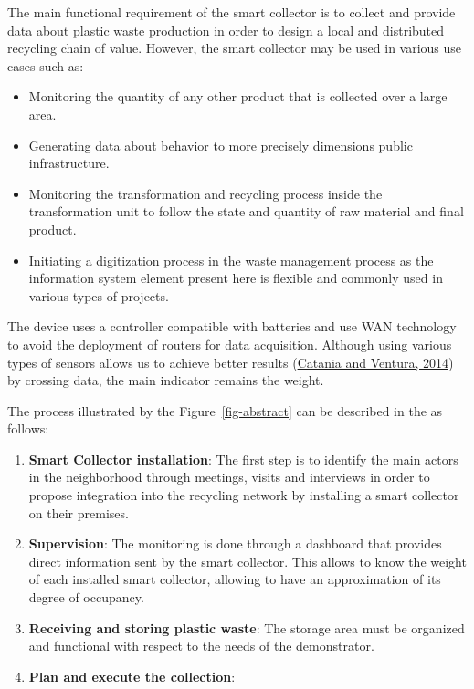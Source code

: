 \documentclass[
  11pt,
]{article}
\providecommand{\tightlist}{%
  \setlength{\itemsep}{0pt}\setlength{\parskip}{0pt}}\usepackage{longtable,booktabs,array}
\begin{document}
The main functional requirement of the smart collector is to collect and
provide data about plastic waste production in order to design a local
and distributed recycling chain of value. However, the smart collector
may be used in various use cases such as:

\begin{itemize}
\tightlist
\item
  Monitoring the quantity of any other product that is collected over a
  large area.\\
\item
  Generating data about behavior to more precisely dimensions public
  infrastructure.\\
\item
  Monitoring the transformation and recycling process inside the
  transformation unit to follow the state and quantity of raw material
  and final product.\\
\item
  Initiating a digitization process in the waste management process as
  the information system element present here is flexible and commonly
  used in various types of projects.
\end{itemize}

The device uses a controller compatible with batteries and use WAN
technology to avoid the deployment of routers for data acquisition.
Although using various types of sensors allows us to achieve better
results (\protect\hyperlink{ref-Catania2014}{Catania and Ventura, 2014})
by crossing data, the main indicator remains the weight.

The process illustrated by the Figure~\ref{fig-abstract} can be
described in the as follows:

\begin{enumerate}
\def\labelenumi{\arabic{enumi}.}
\item
  \textbf{Smart Collector installation}: The first step is to identify
  the main actors in the neighborhood through meetings, visits and
  interviews in order to propose integration into the recycling network
  by installing a smart collector on their premises.
\item
  \textbf{Supervision}: The monitoring is done through a dashboard that
  provides direct information sent by the smart collector. This allows
  to know the weight of each installed smart collector, allowing to have
  an approximation of its degree of occupancy.
\item
  \textbf{Receiving and storing plastic waste}: The storage area must be
  organized and functional with respect to the needs of the
  demonstrator.
\item
  \textbf{Plan and execute the collection}:
\end{enumerate}
\end{document}
